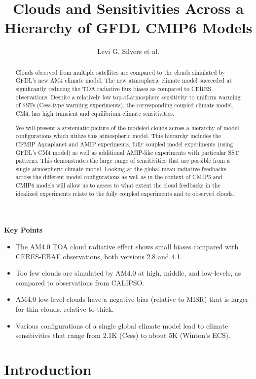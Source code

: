 \documentclass[11pt]{article}   	%
\title{Clouds and Sensitivities Across a Hierarchy of GFDL CMIP6 Models}
\author{Levi G. Silvers et al.}
\begin{document}
\maketitle

\begin{abstract}
Clouds observed from multiple satellites are compared to the clouds simulated by GFDL's new AM4 climate model.  
The new atmospheric climate model succeeded at significantly reducing the TOA radiative flux biases as compared 
to CERES observations.  Despite a relatively low top-of-atmosphere sensitivity to uniform warming of SSTs 
(Cess-type warming experiments), the corresponding coupled climate model, CM4, has high transient and 
equilibrium climate sensitivities.  

We will present a systematic picture of the modeled clouds across a hierarchy of model configurations which utilize this atmospheric model.  This hierarchy includes the CFMIP Aquaplanet and AMIP experiments, fully coupled model experiments (using GFDL's CM4 model) as well as additional AMIP-like experiments with particular SST patterns.  This demonstrates the large range of sensitivities that are possible from a single atmospheric climate model.   Looking at the global mean radiative feedbacks across the different model configurations as well as in the context of CMIP5 and CMIP6 models will allow us to assess to what extent the cloud feedbacks in the idealized experiments relate to the fully coupled experiments and to observed clouds.  
\end{abstract}


\textbf{Key Points}
\begin{itemize}
  \item{The AM4.0 TOA cloud radiative effect shows small biases compared with CERES-EBAF observations, both versions 
  2.8 and 4.1.}
  \item{Too few clouds are simulated by AM4.0 at high, middle, and low-levels, as compared to observations from CALIPSO.}
  \item{AM4.0 low-level clouds have a negative bias (relative to MISR) that is larger for thin clouds, relative to thick.}
  \item{Various configurations of a single global climate model lead to climate sensitivities that range from 2.1K (Cess) to 
  about 5K (Winton's ECS).}
\end{itemize}

\section{Introduction}
\end{document}

